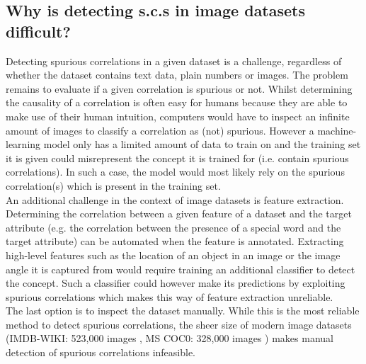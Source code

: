 \documentclass{article}
\begin{document}
\subsection{Why is detecting s.c.s in image datasets difficult?}
\label{sec:challenges}
Detecting spurious correlations in a given dataset is a challenge, regardless of whether the dataset contains
text data, plain numbers or images. The problem remains to evaluate if a given correlation is spurious or not.
Whilst determining the causality of a correlation is often easy for humans because they are able to make use of
their human intuition, computers would have to inspect an infinite amount of images to classify a correlation as
(not) spurious. However a machine-learning model only has a limited amount of data to train on and the training
set it is given could misrepresent the concept it is trained for (i.e. contain spurious correlations).
In such a case, the model would most likely rely on the spurious correlation(s) which is present in the training set. \\
An additional challenge in the context of image datasets is feature extraction. Determining the correlation
between a given feature of a dataset and the target attribute (e.g. the correlation between the presence of a special word
and the target attribute) can be automated when the feature is annotated. Extracting high-level features such as
the location of an object in an image or the image angle it is captured from would require training
an additional classifier to detect the concept. Such a classifier could however make its predictions by exploiting spurious
correlations which makes this way of feature extraction unreliable. \\
The last option is to inspect the dataset manually. While this is the most reliable method to detect spurious correlations,
the sheer size of modern image datasets (IMDB-WIKI: 523,000 images \cite{Rothe-ICCVW-2015}, MS COC0: 328,000 images 
\cite{lin2015microsoft}) makes manual detection of spurious correlations infeasible.
\end{document}

